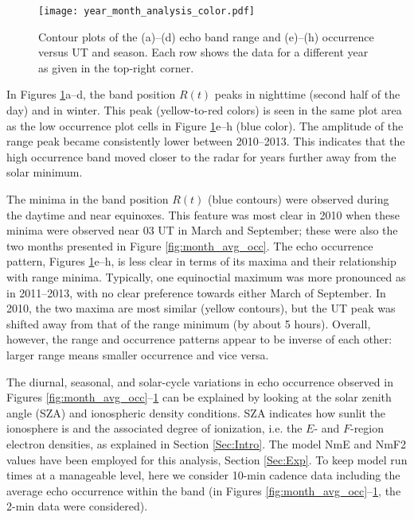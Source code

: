 \begin{figure}
\texttt{[image: year\_month\_analysis\_color.pdf]}
\caption{Contour plots of the (a)--(d) echo band range and (e)--(h) occurrence versus UT and season. Each row shows the data for a different year as given in the top-right corner.}
\label{fig:year_color}
\end{figure}

In Figures \ref{fig:year_color}a--d, the band position \(R\left(t\right)\) peaks in nighttime (second half of the day) and in winter. This peak (yellow-to-red colors) is seen in the same plot area as the low occurrence plot cells in Figure \ref{fig:year_color}e--h (blue color). The amplitude of the range peak became consistently lower between 2010--2013.  This indicates that the high occurrence band moved closer to the radar for years further away from the solar minimum.

The minima in the band position \(R\left(t\right)\) (blue contours) were observed during the daytime and near equinoxes. This feature was most clear in 2010 when these minima were observed near 03 UT in March and September; these were also the two months presented in Figure \ref{fig:month_avg_occ}. The echo occurrence pattern, Figures \ref{fig:year_color}e--h, is less clear in terms of its maxima and their relationship with range minima. Typically, one equinoctial maximum was more pronounced as in 2011--2013, with no clear preference towards either March of September. In 2010, the two maxima are most similar (yellow contours), but the UT peak was shifted away from that of the range minimum (by about 5 hours). Overall, however, the range and occurrence patterns appear to be inverse of each other: larger range means smaller occurrence and vice versa.

The diurnal, seasonal, and solar-cycle variations in echo occurrence observed in Figures \ref{fig:month_avg_occ}--\ref{fig:year_color} can be explained by looking at the solar zenith angle (SZA) and ionospheric density conditions. SZA indicates how sunlit the ionosphere is and the associated degree of ionization, i.e. the \(E\)- and \(F\)-region electron densities, as explained in Section \ref{Sec:Intro}. The model NmE and NmF2 values have been employed for this analysis, Section \ref{Sec:Exp}. To keep model run times at a manageable level, here we consider 10-min cadence data including the average echo occurrence within the band (in Figures \ref{fig:month_avg_occ}--\ref{fig:year_color}, the 2-min data were considered).



